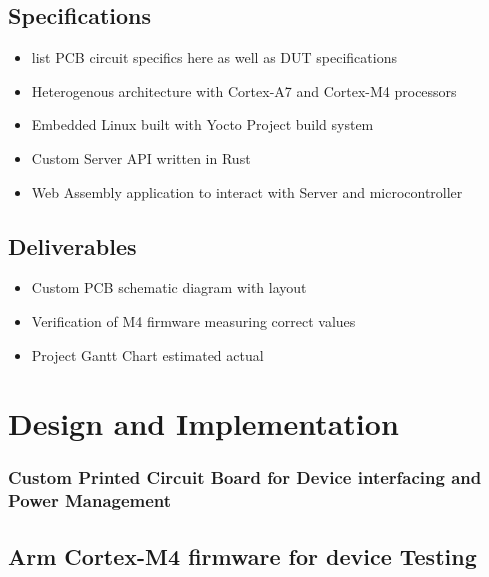 \documentclass[12pt]{article}
\begin{document}
\subsection{Specifications}
\begin{itemize}
  \item list PCB circuit specifics here as well as DUT specifications
  \item Heterogenous architecture with Cortex-A7 and Cortex-M4 processors
  \item Embedded Linux built with Yocto Project build system
  \item Custom Server API written in Rust
  \item Web Assembly application to interact with Server and microcontroller
\end{itemize}

\subsection{Deliverables}
\begin{itemize}
  \item Custom PCB schematic diagram with layout
  \item Verification of M4 firmware measuring correct values
  \item Project Gantt Chart estimated actual 
\end{itemize}


% 
\section{Design and Implementation}
\subsubsection{Custom Printed Circuit Board for Device interfacing and Power Management}

\subsection{Arm Cortex-M4 firmware for device Testing}
\end{document}
